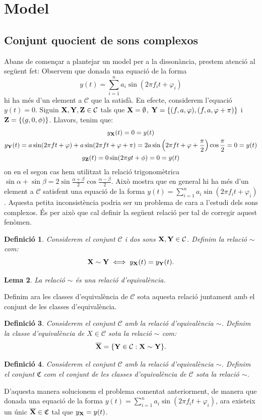\documentclass{article}
\theoremstyle{math}
\newtheorem{definition}{Definició}[section]
\newtheorem{lemma}[definition]{Lema}
\newcommand{\0}{\ensuremath{\vb{0}}}
\newcommand{\X}{\ensuremath{\vb{X}}}
\newcommand{\Y}{\ensuremath{\vb{Y}}}
\newcommand{\Z}{\ensuremath{\vb{Z}}}
\begin{document}
\section{Model}\label{model}
\subsection{Conjunt quocient de sons complexos}
Abans de començar a plantejar un model per a la dissonància, prestem atenció al següent fet: Observem que donada una equació de la forma $$y(t)=\sum_{i=1}^na_i\sin(2\pi f_it+\varphi_i)$$ hi ha més d'un element a $\mathcal{C}$ que la satisfà. En efecte, considerem l'equació $y(t)=0$. Siguin $\X,\Y,\Z\in\mathcal{C}$ tals que $\X=\emptyset$, $\Y=\{(f,a,\varphi),(f,a,\varphi+\pi)\}$ i $\Z=\{(g,0,\phi)\}$. Llavors, tenim que:
\begin{gather*}
    y_{\X}(t)=0=y(t)\\
    y_{\Y}(t)=a\sin(2\pi ft+\varphi)+a\sin(2\pi ft+\varphi+\pi)=2a\sin\left(2\pi ft+\varphi +\frac{\pi}{2}\right)\cos\frac{\pi}{2}=0=y(t)\\
    y_{\Z}(t)=0\sin(2\pi gt+\phi)=0=y(t)
\end{gather*}
on en el segon cas hem utilitzat la relació trigonomètrica $\sin\alpha+\sin\beta=2\sin\frac{\alpha+\beta}{2}\cos\frac{\alpha-\beta}{2}$. Això mostra que en general hi ha més d'un element a $\mathcal{C}$ satisfent una equació de la forma $y(t)=\sum_{i=1}^na_i\sin(2\pi f_it+\varphi_i)$. Aquesta petita inconsistència podria ser un problema de cara a l'estudi dels sons complexos. És per això que cal definir la següent relació per tal de corregir aquest fenòmen.
\begin{definition}
    Considerem el conjunt $\mathcal{C}$ i dos sons $\X,\Y\in\mathcal{C}$. Definim la relació $\sim$ com: $$\X\sim \Y\iff y_{\X}(t)=y_{\Y}(t).$$
\end{definition}
\begin{lemma}
    La relació $\sim$ és una relació d'equivalència.
\end{lemma}
Definim ara les classes d'equivalència de $\mathcal{C}$ sota aquesta relació juntament amb el conjunt de les classes d'equivalència.
\begin{definition}
    Considerem el conjunt $\mathcal{C}$ amb la relació d'equivalència $\sim$. Definim la classe d'equivalència de $X\in\mathcal{C}$ sota la relació $\sim$ com: $$\overline{\X}=\{\Y\in\mathcal{C}:\X\sim \Y\}.$$
\end{definition}
\begin{definition}
    Considerem el conjunt $\mathcal{C}$ amb la relació d'equivalència $\sim$. Definim el conjunt $\mathfrak{C}$ com el conjunt de les classes d'equivalència de $\mathcal{C}$ sota la relació $\sim$.
\end{definition}
D'aquesta manera solucionem el problema comentat anteriorment, de manera que donada una equació de la forma $y(t)=\sum_{i=1}^na_i\sin(2\pi f_it+\varphi_i)$, ara existeix un únic $\overline{\X}\in\mathfrak{C}$ tal que $y_{\X}=y(t)$.
\end{document}
